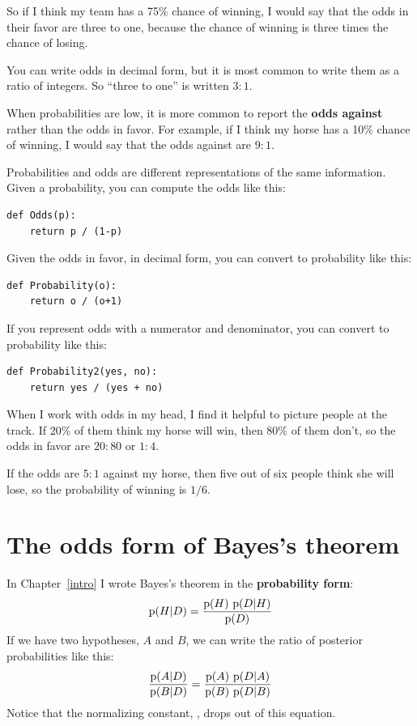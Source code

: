 \documentclass[12pt]{book}
\begin{document}
So if I think my team has a 75\% chance of winning, I would
say that the odds in their favor are three to one, because
the chance of winning is three times the chance of losing.

You can write odds in decimal form, but it is most common to
write them as a ratio of integers.  So ``three to one'' is
written $3:1$.

When probabilities are low, it is more common to report the
{\bf odds against} rather than the odds in favor.  For
example, if I think my horse has a 10\% chance of winning,
I would say that the odds against are $9:1$.

Probabilities and odds are different representations of the
same information.  Given a probability, you can compute the
odds like this:

\begin{verbatim}
def Odds(p):
    return p / (1-p)
\end{verbatim}

Given the odds in favor, in decimal form, you can convert to
probability like this:

\begin{verbatim}
def Probability(o):
    return o / (o+1)
\end{verbatim}

If you represent odds with a numerator and denominator, you
can convert to probability like this:

\begin{verbatim}
def Probability2(yes, no):
    return yes / (yes + no)
\end{verbatim}

When I work with odds in my head, I find it helpful to picture
people at the track.  If 20\% of them think my horse will win,
then 80\% of them don't, so the odds in favor are $20:80$ or
$1:4$.

If the odds are $5:1$ against my horse, then five out of six
people think she will lose, so the probability of winning
is $1/6$.


\section{The odds form of Bayes's theorem}

In Chapter~\ref{intro} I wrote Bayes's theorem in the {\bf probability
form}:
%
\[ \mathrm{p}(H|D) = \frac{\mathrm{p}(H)~\mathrm{p}(D|H)}{\mathrm{p}(D)} \]
%
If we have two hypotheses, $A$ and $B$, 
we can write the ratio of posterior probabilities like this:
%
\[ \frac{\mathrm{p}(A|D)}{\mathrm{p}(B|D)} = \frac{\mathrm{p}(A)~\mathrm{p}(D|A)}
                                        {\mathrm{p}(B)~\mathrm{p}(D|B)} \]
%
Notice that the normalizing constant, , drops out of
this equation.
\end{document}
